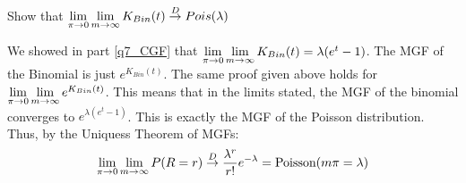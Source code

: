 Show that $\underset{\pi\rightarrow 0}{\lim}\,\underset{m\rightarrow \infty}{\lim}\, K_{Bin}(t)\overset{D}{\rightarrow} Pois(\lambda)$

We showed in part \ref{q7_CGF} that $\underset{\pi\rightarrow 0}{\lim}\,\underset{m\rightarrow \infty}{\lim}\, K_{Bin}(t) = \lambda(e^t-1)$.
The MGF of the Binomial is just $e^{K_{Bin}(t)}$. The same proof given above holds for $\underset{\pi\rightarrow 0}{\lim}\,\underset{m\rightarrow \infty}{\lim}\, e^{K_{Bin}(t)}$.
This means that in the limits stated, the MGF of the binomial converges to $e^{\lambda(e^t-1)}$. 
This is exactly the MGF of the Poisson distribution. 
Thus, by the Uniquess Theorem of MGFs:
\begin{equation*}
    \underset{\pi\rightarrow 0}{\lim}\,\underset{m\rightarrow \infty}{\lim}\, P(R=r) \overset{D}{\rightarrow} \frac{\lambda^{r}}{r!}e^{-\lambda} = \text{Poisson}(m\pi=\lambda)
\end{equation*}

